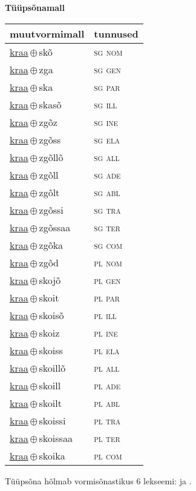 

\vspace{3.5em}
\noindent \begin{minipage}{\textwidth}
\noindent \textbf{Tüüpsõnamall \,}\\

\begin{sideways}
\begin{tabular}{l l}
muutvormimall & tunnused \\
\hline
\underline{kraa}\,$\oplus$\,skõ & \textsc{ sg nom } \\
\underline{kraa}\,$\oplus$\,zga & \textsc{ sg gen } \\
\underline{kraa}\,$\oplus$\,ska & \textsc{ sg par } \\
\underline{kraa}\,$\oplus$\,skasõ & \textsc{ sg ill } \\
\underline{kraa}\,$\oplus$\,zgõz & \textsc{ sg ine } \\
\underline{kraa}\,$\oplus$\,zgõss & \textsc{ sg ela } \\
\underline{kraa}\,$\oplus$\,zgõllõ & \textsc{ sg all } \\
\underline{kraa}\,$\oplus$\,zgõll & \textsc{ sg ade } \\
\underline{kraa}\,$\oplus$\,zgõlt & \textsc{ sg abl } \\
\underline{kraa}\,$\oplus$\,zgõssi & \textsc{ sg tra } \\
\underline{kraa}\,$\oplus$\,zgõssaa & \textsc{ sg ter } \\
\underline{kraa}\,$\oplus$\,zgõka & \textsc{ sg com } \\
\underline{kraa}\,$\oplus$\,zgõd & \textsc{ pl nom } \\
\underline{kraa}\,$\oplus$\,skojõ & \textsc{ pl gen } \\
\underline{kraa}\,$\oplus$\,skoit & \textsc{ pl par } \\
\underline{kraa}\,$\oplus$\,skoisõ & \textsc{ pl ill } \\
\underline{kraa}\,$\oplus$\,skoiz & \textsc{ pl ine } \\
\underline{kraa}\,$\oplus$\,skoiss & \textsc{ pl ela } \\
\underline{kraa}\,$\oplus$\,skoillõ & \textsc{ pl all } \\
\underline{kraa}\,$\oplus$\,skoill & \textsc{ pl ade } \\
\underline{kraa}\,$\oplus$\,skoilt & \textsc{ pl abl } \\
\underline{kraa}\,$\oplus$\,skoissi & \textsc{ pl tra } \\
\underline{kraa}\,$\oplus$\,skoissaa & \textsc{ pl ter } \\
\underline{kraa}\,$\oplus$\,skoika & \textsc{ pl com } \\
\end{tabular}
\end{sideways}
\label{tab:tüüpsõnamall-kraaskõ}

\end{minipage}

 
\vspace{1em}
\noindent Tüüpsõna hõlmab vormisõnastikus 6 lekseemi:  ja .

